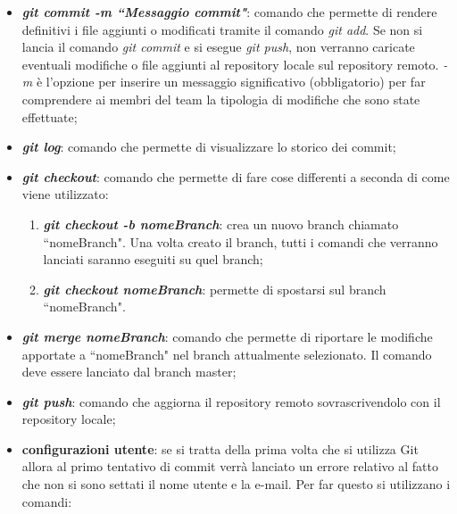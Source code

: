 \begin{itemize}
                        \item \textbf{\textit{git commit -m ``Messaggio commit"}}: comando che permette di
                        rendere definitivi i file aggiunti o modificati tramite il comando \textit{git add}.
                        Se non si lancia il comando \textit{git commit} e si esegue \textit{git push}, non
                        verranno caricate eventuali modifiche o file aggiunti al repository locale sul
                        repository remoto. \textit{-m} è l'opzione per inserire un messaggio significativo
                        (obbligatorio) per far comprendere ai membri del team la tipologia di modifiche che
                        sono state effettuate;
                        \item \textbf{\textit{git log}}: comando che permette di visualizzare lo storico
                        dei commit;
                        \item \textbf{\textit{git checkout}}: comando che permette di fare cose differenti
                        a seconda di come viene utilizzato:

                            \begin{enumerate}
                                \item \textbf{\textit{git checkout -b nomeBranch}}: crea un nuovo
                                branch chiamato ``nomeBranch". Una volta creato il branch, tutti
                                i comandi che verranno lanciati saranno eseguiti su quel branch;
                                \item \textbf{\textit{git checkout nomeBranch}}: permette di spostarsi sul
                                branch ``nomeBranch".
                            \end{enumerate}

                        \item \textbf{\textit{git merge nomeBranch}}: comando che permette di riportare le modifiche apportate a ``nomeBranch" nel branch attualmente selezionato.
                        Il comando deve essere lanciato dal branch master;
                        \item \textbf{\textit{git push}}: comando che aggiorna il repository remoto
                        sovrascrivendolo con il repository locale;
                        \item \textbf{configurazioni utente}: se si tratta della prima volta che si utilizza
                        Git allora al primo tentativo di commit verrà lanciato un errore relativo al fatto
                        che non si sono settati il nome utente e la e-mail.
                        Per far questo si utilizzano i comandi:


\end{itemize}
